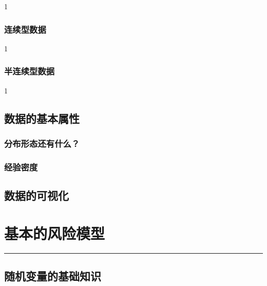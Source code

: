 \documentclass[
]{book}
\begin{document}
1

\hypertarget{ux8fdeux7eedux578bux6570ux636e}{%
\subsection{连续型数据}\label{ux8fdeux7eedux578bux6570ux636e}}

1

\hypertarget{ux534aux8fdeux7eedux578bux6570ux636e}{%
\subsection{半连续型数据}\label{ux534aux8fdeux7eedux578bux6570ux636e}}

1

\hypertarget{ux6570ux636eux7684ux57faux672cux5c5eux6027}{%
\section{数据的基本属性}\label{ux6570ux636eux7684ux57faux672cux5c5eux6027}}

\hypertarget{ux5206ux5e03ux5f62ux6001ux8fd8ux6709ux4ec0ux4e48}{%
\subsection{分布形态还有什么？}\label{ux5206ux5e03ux5f62ux6001ux8fd8ux6709ux4ec0ux4e48}}

\hypertarget{ux7ecfux9a8cux5bc6ux5ea6}{%
\subsection{经验密度}\label{ux7ecfux9a8cux5bc6ux5ea6}}

\hypertarget{ux6570ux636eux7684ux53efux89c6ux5316}{%
\section{数据的可视化}\label{ux6570ux636eux7684ux53efux89c6ux5316}}

\hypertarget{riskmod}{%
\chapter{基本的风险模型}\label{riskmod}}

\begin{center}\rule{0.5\linewidth}{0.5pt}\end{center}

\hypertarget{ux968fux673aux53d8ux91cfux7684ux57faux7840ux77e5ux8bc6}{%
\section{随机变量的基础知识}\label{ux968fux673aux53d8ux91cfux7684ux57faux7840ux77e5ux8bc6}}
\end{document}
